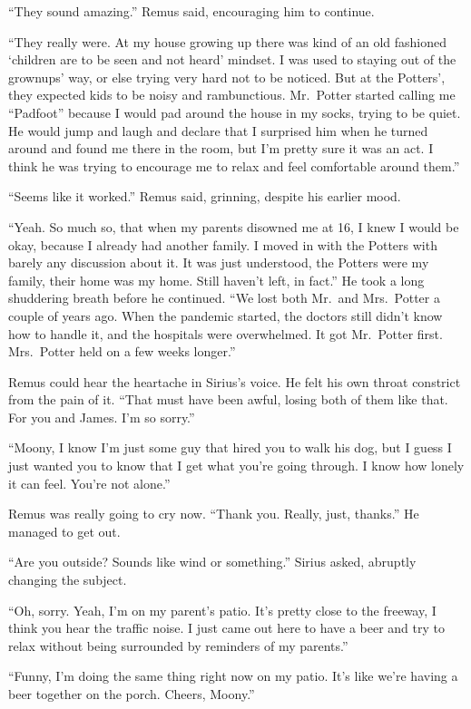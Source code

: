 \documentclass[12pt,twoside,openright]{memoir}
\begin{document}
``They sound amazing.'' Remus said, encouraging him to continue.

``They really were. At my house growing up there was kind of an old fashioned `children are to be seen and not heard' mindset. I was used to staying out of the grownups' way, or else trying very hard not to be noticed. But at the Potters', they expected kids to be noisy and rambunctious. Mr.\ Potter started calling me ``Padfoot'' because I would pad around the house in my socks, trying to be quiet. He would jump and laugh and declare that I surprised him when he turned around and found me there in the room, but I'm pretty sure it was an act. I think he was trying to encourage me to relax and feel comfortable around them.''

``Seems like it worked.'' Remus said, grinning, despite his earlier mood.

``Yeah. So much so, that when my parents disowned me at 16, I knew I would be okay, because I already had another family. I moved in with the Potters with barely any discussion about it. It was just understood, the Potters were my family, their home was my home. Still haven't left, in fact.'' He took a long shuddering breath before he continued. ``We lost both Mr.\ and Mrs.\ Potter a couple of years ago. When the pandemic started, the doctors still didn't know how to handle it, and the hospitals were overwhelmed. It got Mr.\ Potter first. Mrs.\ Potter held on a few weeks longer.'' 

Remus could hear the heartache in Sirius's voice. He felt his own throat constrict from the pain of it. ``That must have been awful, losing both of them like that. For you and James. I'm so sorry.''

``Moony, I know I'm just some guy that hired you to walk his dog, but I guess I just wanted you to know that I get what you're going through. I know how lonely it can feel. You're not alone.''

Remus was really going to cry now. ``Thank you. Really, just, thanks.'' He managed to get out.

``Are you outside? Sounds like wind or something.'' Sirius asked, abruptly changing the subject.

``Oh, sorry. Yeah, I'm on my parent's patio. It's pretty close to the freeway, I think you hear the traffic noise. I just came out here to have a beer and try to relax without being surrounded by reminders of my parents.''

``Funny, I'm doing the same thing right now on my patio. It's like we're having a beer together on the porch. Cheers, Moony.''
\end{document}
